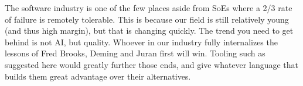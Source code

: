 \documentclass{article}
\begin{document}
The software industry is one of the few places aside from SoEs where a 2/3 rate of failure \cite{standish} is remotely tolerable.
This is because our field is still relatively young (and thus high margin), but that is changing quickly.
The trend you need to get behind is not AI, but quality.
Whoever in our industry fully internalizes the lessons of Fred Brooks, Deming and Juran first will win.
Tooling such as suggested here would greatly further those ends, and give whatever language that builds them great advantage over their alternatives.

\newpage


\end{document}
